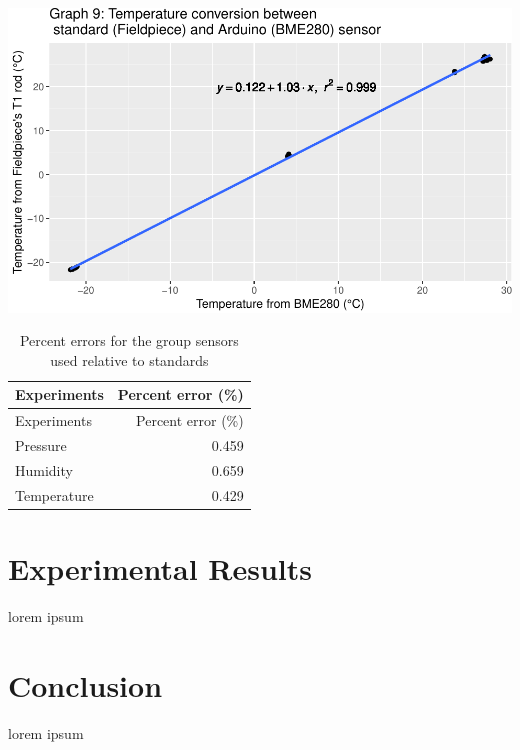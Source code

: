 \documentclass[12pt,]{article}
\begin{document}
\includegraphics{paper_files/figure-latex/bme_temp-1.pdf}

\begin{longtable}[]{@{}lr@{}}
\caption{Percent errors for the group sensors used relative to
standards}\tabularnewline
\toprule
Experiments & Percent error (\%)\tabularnewline
\midrule
\endfirsthead
\toprule
Experiments & Percent error (\%)\tabularnewline
\midrule
\endhead
Pressure & 0.459\tabularnewline
Humidity & 0.659\tabularnewline
Temperature & 0.429\tabularnewline
\bottomrule
\end{longtable}

\section{Experimental Results}\label{experimental-results}

lorem ipsum

\section{Conclusion}\label{conclusion}

lorem ipsum
\end{document}
